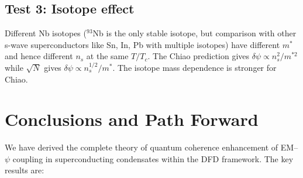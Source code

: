 \documentclass[12pt,aps,prd,twocolumn,superscriptaddress,nofootinbib]{revtex4-2}
\begin{document}
\subsection{Test 3: Isotope effect}

Different Nb isotopes ($^{93}$Nb is the only stable isotope, but
comparison with other s-wave superconductors like Sn, In, Pb with
multiple isotopes) have different $m^*$ and hence different $n_s$
at the same $T/T_c$. The Chiao prediction gives
$\delta\psi \propto n_s^2/m^{*2}$ while $\sqrt{N}$ gives
$\delta\psi \propto n_s^{1/2}/m^*$. The isotope mass dependence
is stronger for Chiao.


\section{Conclusions and Path Forward}
\label{sec:conclusions}

We have derived the complete theory of quantum coherence enhancement
of EM--$\psi$ coupling in superconducting condensates within the DFD
framework. The key results are:
\end{document}
